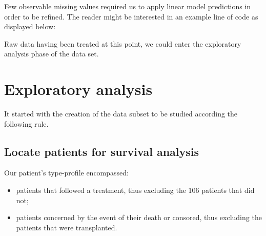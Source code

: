 \documentclass[]{article}
\newenvironment{Shaded}{\begin{snugshade}}{\end{snugshade}}
\newcommand{\KeywordTok}[1]{\textcolor[rgb]{0.13,0.29,0.53}{\textbf{#1}}}
\newcommand{\DataTypeTok}[1]{\textcolor[rgb]{0.13,0.29,0.53}{#1}}
\newcommand{\DecValTok}[1]{\textcolor[rgb]{0.00,0.00,0.81}{#1}}
\newcommand{\StringTok}[1]{\textcolor[rgb]{0.31,0.60,0.02}{#1}}
\newcommand{\CommentTok}[1]{\textcolor[rgb]{0.56,0.35,0.01}{\textit{#1}}}
\newcommand{\OperatorTok}[1]{\textcolor[rgb]{0.81,0.36,0.00}{\textbf{#1}}}
\newcommand{\NormalTok}[1]{#1}
\providecommand{\tightlist}{%
  \setlength{\itemsep}{0pt}\setlength{\parskip}{0pt}}
\begin{document}
Few observable missing values required us to apply linear model
predictions in order to be refined. The reader might be interested in an
example line of code as displayed below:

\begin{Shaded}
\end{Shaded}

Raw data having been treated at this point, we could enter the
exploratory analysis phase of the data set.

\section{Exploratory analysis}\label{exploratory-analysis}

It started with the creation of the data subset to be studied according
the following rule.

\subsection{Locate patients for survival
analysis}\label{locate-patients-for-survival-analysis}

Our patient's type-profile encompassed:

\begin{itemize}
\tightlist
\item
  patients that followed a treatment, thus excluding the 106 patients
  that did not;
\item
  patients concerned by the event of their death or consored, thus
  excluding the patients that were transplanted.
\end{itemize}

\begin{Shaded}
\end{Shaded}
\end{document}
